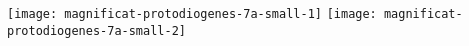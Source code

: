 \texttt{[image: magnificat-protodiogenes-7a-small-1]}%
\ifx\betweenLilyPondSystem \undefined
  \linebreak
\else
  \expandafter{}%
\fi
\texttt{[image: magnificat-protodiogenes-7a-small-2]}%
